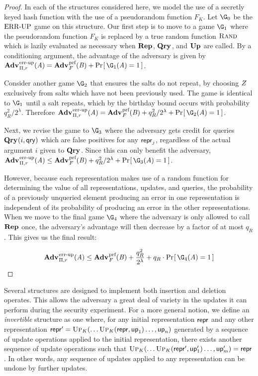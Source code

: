 \begin{proof}
In each of the structures considered here, we model the use of a secretly keyed hash function with the use of a pseudorandom function $F_K$. Let $\G_0$ be the $\textnormal{ERR\mbox{-}UP}$ game on this structure. Our first step is to move to a game $\G_1$ where the pseudorandom function $F_K$ is replaced by a true random function $\textsc{Rand}$ which is lazily evaluated as necessary when $\mathbf{Rep}\hspace{0.5pt}$, $\mathbf{Qry}\hspace{0.5pt}$, and $\mathbf{Up}\hspace{0.5pt}$ are called. By a conditioning argument, the advantage of the adversary is given by $\Adv{\errep}_{\struct,r}(\advA) = \Adv{\prf}_F(\advB) + \Prob{\G_1(\advA)=1}$.

Consider another game $\G_2$ that ensures the salts do not repeat, by choosing $Z$ exclusively from salts which have not been previously used. The game is identical to $\G_1$ until a salt repeats, which by the birthday bound occurs with probability $q_R^2/2^\lambda$. Therefore $\Adv{\errep}_{\struct,r}(\advA) = \Adv{\prf}_F(\advB) + q_R^2/2^\lambda + \Prob{\G_2(A) = 1}$.

Next, we revise the game to $\G_3$ where the adversary gets credit for queries $\mathbf{Qry}\hspace{0.5pt}(i,\mathsf{qry})$ which are false positives for any $\mathsf{repr}_j$, regardless of the actual argument $i$ given to $\mathbf{Qry}\hspace{0.5pt}$. Since this can only benefit the adversary, $\Adv{\errep}_{\struct,r}(\advA) \le \Adv{\prf}_F(\advB) + q_R^2/2^\lambda + \Prob{\G_3(A) = 1}$.

However, because each representation makes use of a random function for determining the value of all representations, updates, and queries, the probability of a previously unqueried element producing an error in one representation is independent of its probability of producing an error in the other representations. When we move to the final game $\G_4$ where the adversary is only allowed to call $\mathbf{Rep}\hspace{0.5pt}$ once, the adversary's advantage will then decrease by a factor of at most $q_R$. This gives us the final result:

$$\Adv{\errep}_{\struct,r}(\advA) \le \Adv{\prf}_F(\advB) + \frac{q_R^2}{2^\lambda} + q_R \cdot \Prob{\G_4(A) = 1}$$\missingqed
\end{proof}


Several structures are designed to implement both insertion and deletion operates. This allows the adversary a great deal of variety in the updates it can perform during the security experiment. For a more general notion, we define an \textit{invertible} structure as one where, for any initial representation $\mathsf{repr}$ and any other representation $\mathsf{repr}' = \textsc{Up}_K(\ldots\textsc{Up}_K(\mathsf{repr},\mathsf{up}_1)\ldots,\mathsf{up}_n)$ generated by a sequence of update operations applied to the initial representation, there exists another sequence of update operations such that $\textsc{Up}_K(\ldots\textsc{Up}_K(\mathsf{repr}',\mathsf{up}'_1)\ldots,\mathsf{up}'_m) = \mathsf{repr}$. In other words, any sequence of updates applied to any representation can be undone by further updates.

